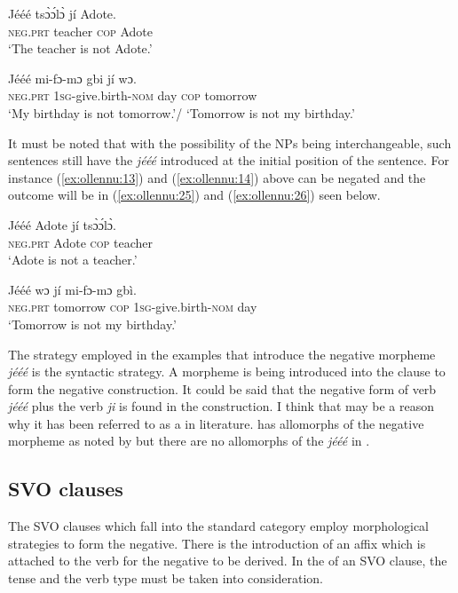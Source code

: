\documentclass[output=paper
,newtxmath
,modfonts
,nonflat]{langsci/langscibook}
\begin{document}
\ea \label{ex:ollennu:23}
\gll J\'e\'e\'e ts\`ɔ\'ɔl\`ɔ j\'i Adote.\\
\textsc{neg}.\textsc{prt} teacher \textsc{cop} Adote\\
\glt `The teacher is not Adote.'
\z

\ea \label{ex:ollennu:24}
\gll J\'e\'e\'e mi-fɔ-mɔ gbi j\'i wɔ.\\
\textsc{neg}.\textsc{prt} 1\textsc{sg}-give.birth-\textsc{nom} day \textsc{cop} tomorrow\\
\glt 	`My birthday is not tomorrow.'/ `Tomorrow is not my birthday.'
\z

It must be noted that with the possibility of the NPs being interchangeable, such sentences still have the  \textit{j\'e\'e\'e} introduced at the initial position of the sentence. For instance (\ref{ex:ollennu:13}) and (\ref{ex:ollennu:14}) above can be negated and the outcome will be in (\ref{ex:ollennu:25}) and (\ref{ex:ollennu:26}) seen below.

\ea \label{ex:ollennu:25}
 \gll J\'e\'e\'e Adote j\'i ts\`ɔ\'ɔl\`ɔ. \\
\textsc{neg}.\textsc{prt} Adote \textsc{cop} teacher\\
\glt `Adote is not a teacher.'
\z

\ea \label{ex:ollennu:26}
\gll J\'e\'e\'e wɔ j\'i mi-fɔ-mɔ gb\`i.\\
\textsc{neg}.\textsc{prt} tomorrow \textsc{cop} 1\textsc{sg}-give.birth-\textsc{nom} day\\
\glt `Tomorrow is not my birthday.'
\z


The strategy employed in the examples that introduce the negative morpheme \textit{j\'e\'e\'e} is the syntactic strategy. A morpheme is being introduced into the clause to form the negative construction. It could be said that the negative form of  verb \textit{j\'e\'e\'e} plus the  verb \textit{ji} is found in the construction. I think that may be a reason why it has been referred to as a  in  literature.  has allomorphs of the negative morpheme as noted by \citet{caesar2012} but there are no allomorphs of the \textit{j\'e\'e\'e}  in .

\subsection{\label{sec:ollennu:2.3} SVO clauses}

The SVO clauses which fall into the standard  category employ morphological strategies to form the negative. There is the introduction of an affix which is attached to the verb for the negative to be derived. In the  of an SVO clause, the tense and the verb type must be taken into consideration.
\end{document}
